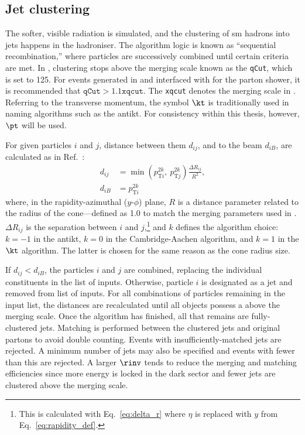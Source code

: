

\subsection{Jet clustering}
\label{subsec:svj_pythia_jet_clustering}

The softer, visible radiation is simulated, and the clustering of \acrshort{sm} hadrons into \glspl{jet} happens in the hadroniser. The algorithm logic is known as ``sequential recombination,'' where particles are successively combined until certain criteria are met. In \PYTHIA, clustering stops above the merging scale known as the \texttt{qCut}, which is set to 125\GeV. For events generated in \MADGRAPH and interfaced with \PYTHIA for the parton shower, it is recommended that $\texttt{qCut} > 1.1 \texttt{xqcut}$. The \texttt{xqcut} denotes the merging scale in \MADGRAPH. Referring to the transverse momentum, the symbol $\kt$ is traditionally used in naming algorithms such as the \gls{antikt}. For consistency within this thesis, however, $\pt$ will be used.

For given particles $i$ and $j$, distance between them $d_{ij}$, and to the beam $d_{iB}$, are calculated as in Ref.~:
\begin{equation}
    \begin{aligned}
d_{ij} &= \min(p_{\mathrm{T}i}^{2k}, \ p_{\mathrm{T}j}^{2k}) \frac{\Delta R_{ij}}{R^2},\\
d_{iB} &= p_{\mathrm{T}i}^{2k}
    \end{aligned}
    \label{eq:distances_kt_pythia}
\end{equation}
where, in the rapidity-azimuthal ($y$-$\phi$) plane, $R$ is a distance parameter related to the radius of the cone---defined as 1.0 to match the merging parameters used in \MADGRAPH. $\Delta R_{ij}$ is the separation between $i$ and $j$,\footnote{This is calculated with Eq.~\ref{eq:delta_r} where $\eta$ is replaced with $y$ from Eq.~\ref{eq:rapidity_def}.} and $k$ defines the algorithm choice: $k = -\text{1}$ in the \gls{antikt}, $k = \text{0}$ in the Cambridge-Aachen algorithm, and $k = \text{1}$ in the $\kt$ algorithm. The latter is chosen for the same reason as the cone radius size.

If $d_{ij} < d_{iB}$, the particles $i$ and $j$ are combined, replacing the individual constituents in the list of inputs. Otherwise, particle $i$ is designated as a jet and removed from list of inputs. For all combinations of particles remaining in the input list, the distances are recalculated until all objects possess a \pt above the merging scale. Once the algorithm has finished, all that remains are fully-clustered \glspl{jet}. Matching is performed between the clustered \glspl{jet} and original partons to avoid double counting. Events with insufficiently-matched \glspl{jet} are rejected. A minimum number of \glspl{jet} may also be specified and events with fewer than this are rejected. A larger $\rinv$ tends to reduce the merging and matching efficiencies since more energy is locked in the dark sector and fewer \glspl{jet} are clustered above the merging scale.

